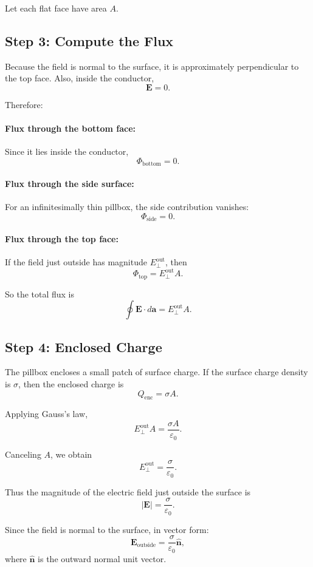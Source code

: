 \documentclass[hidelinks]{article}
\begin{document}
Let each flat face have area $A$.

\subsection{Step 3: Compute the Flux}

Because the field is normal to the surface, it is approximately perpendicular to the top face. Also, inside the conductor,
\[
\mathbf{E}=0.
\]

Therefore:

\paragraph{Flux through the bottom face:}
Since it lies inside the conductor,
\[
\Phi_{\text{bottom}}=0.
\]

\paragraph{Flux through the side surface:}
For an infinitesimally thin pillbox, the side contribution vanishes:
\[
\Phi_{\text{side}}=0.
\]

\paragraph{Flux through the top face:}
If the field just outside has magnitude $E_{\perp}^{\text{out}}$, then
\[
\Phi_{\text{top}}=E_{\perp}^{\text{out}}A.
\]

So the total flux is
\[
\oint \mathbf{E}\cdot d\mathbf{a}=E_{\perp}^{\text{out}}A.
\]

\subsection{Step 4: Enclosed Charge}

The pillbox encloses a small patch of surface charge. If the surface charge density is $\sigma$, then the enclosed charge is
\[
Q_{\mathrm{enc}}=\sigma A.
\]

Applying Gauss's law,
\[
E_{\perp}^{\text{out}}A=\frac{\sigma A}{\varepsilon_0}.
\]

Canceling $A$, we obtain
\[
E_{\perp}^{\text{out}}=\frac{\sigma}{\varepsilon_0}.
\]

Thus the magnitude of the electric field just outside the surface is
\[
\boxed{|\mathbf{E}|=\frac{\sigma}{\varepsilon_0}.}
\]

Since the field is normal to the surface, in vector form:
\[
\boxed{\mathbf{E}_{\text{outside}}=\frac{\sigma}{\varepsilon_0}\hat{\mathbf{n}},}
\]
where $\hat{\mathbf{n}}$ is the outward normal unit vector.
\end{document}
